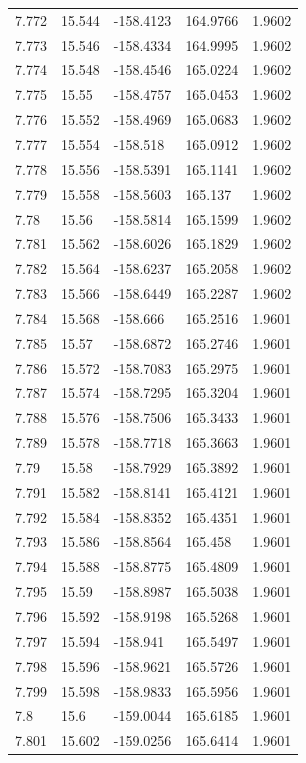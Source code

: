 \begin{tabular}{lllll}
7.772 & 15.544 & -158.4123 & 164.9766 & 1.9602 \\
7.773 & 15.546 & -158.4334 & 164.9995 & 1.9602 \\
7.774 & 15.548 & -158.4546 & 165.0224 & 1.9602 \\
7.775 & 15.55 & -158.4757 & 165.0453 & 1.9602 \\
7.776 & 15.552 & -158.4969 & 165.0683 & 1.9602 \\
7.777 & 15.554 & -158.518 & 165.0912 & 1.9602 \\
7.778 & 15.556 & -158.5391 & 165.1141 & 1.9602 \\
7.779 & 15.558 & -158.5603 & 165.137 & 1.9602 \\
7.78 & 15.56 & -158.5814 & 165.1599 & 1.9602 \\
7.781 & 15.562 & -158.6026 & 165.1829 & 1.9602 \\
7.782 & 15.564 & -158.6237 & 165.2058 & 1.9602 \\
7.783 & 15.566 & -158.6449 & 165.2287 & 1.9602 \\
7.784 & 15.568 & -158.666 & 165.2516 & 1.9601 \\
7.785 & 15.57 & -158.6872 & 165.2746 & 1.9601 \\
7.786 & 15.572 & -158.7083 & 165.2975 & 1.9601 \\
7.787 & 15.574 & -158.7295 & 165.3204 & 1.9601 \\
7.788 & 15.576 & -158.7506 & 165.3433 & 1.9601 \\
7.789 & 15.578 & -158.7718 & 165.3663 & 1.9601 \\
7.79 & 15.58 & -158.7929 & 165.3892 & 1.9601 \\
7.791 & 15.582 & -158.8141 & 165.4121 & 1.9601 \\
7.792 & 15.584 & -158.8352 & 165.4351 & 1.9601 \\
7.793 & 15.586 & -158.8564 & 165.458 & 1.9601 \\
7.794 & 15.588 & -158.8775 & 165.4809 & 1.9601 \\
7.795 & 15.59 & -158.8987 & 165.5038 & 1.9601 \\
7.796 & 15.592 & -158.9198 & 165.5268 & 1.9601 \\
7.797 & 15.594 & -158.941 & 165.5497 & 1.9601 \\
7.798 & 15.596 & -158.9621 & 165.5726 & 1.9601 \\
7.799 & 15.598 & -158.9833 & 165.5956 & 1.9601 \\
7.8 & 15.6 & -159.0044 & 165.6185 & 1.9601 \\
7.801 & 15.602 & -159.0256 & 165.6414 & 1.9601 \\

\end{tabular}
